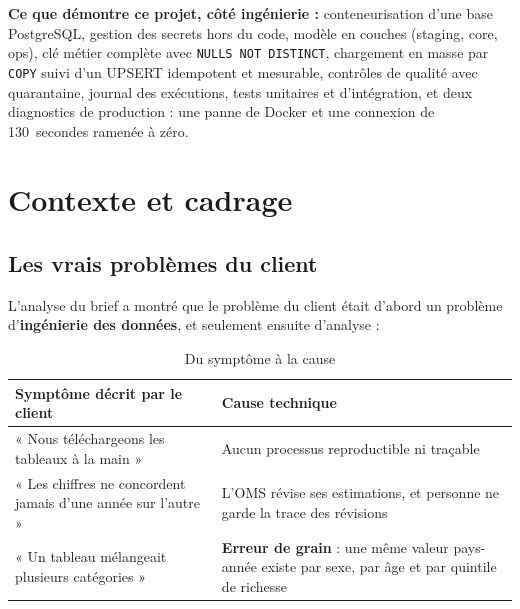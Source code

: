 \documentclass[11pt, a4paper, oneside, headings=normal, numbers=noenddot, DIV=12]{scrartcl}
\begin{document}
\textbf{Ce que démontre ce projet, côté ingénierie :} conteneurisation d'une base PostgreSQL, gestion des secrets hors du code, modèle
en couches (staging, core, ops), clé métier complète avec \texttt{NULLS NOT DISTINCT}, chargement en masse par \texttt{COPY} suivi d'un UPSERT
idempotent et mesurable, contrôles de qualité avec quarantaine, journal des exécutions, tests unitaires et d'intégration, et deux diagnostics
de production : une panne de Docker et une connexion de 130~secondes ramenée à zéro.

\section{Contexte et cadrage}

\subsection{Les vrais problèmes du client}
L'analyse du brief a montré que le problème du client était d'abord un problème d'\textbf{ingénierie des données}, et seulement ensuite d'analyse :

\begin{table}[H]
\centering\small
\begin{tabularx}{\linewidth}{@{}L{4.4cm} Y@{}}
\toprule
\textbf{Symptôme décrit par le client} & \textbf{Cause technique} \\
\midrule
« Nous téléchargeons les tableaux à la main » & Aucun processus reproductible ni traçable \\
« Les chiffres ne concordent jamais d'une année sur l'autre » & L'OMS révise ses estimations, et personne ne garde la trace des révisions \\
« Un tableau mélangeait plusieurs catégories » & \textbf{Erreur de grain} : une même valeur pays-année existe par sexe, par âge et par quintile de richesse \\
\bottomrule
\end{tabularx}
\caption{Du symptôme à la cause}
\end{table}
\end{document}

